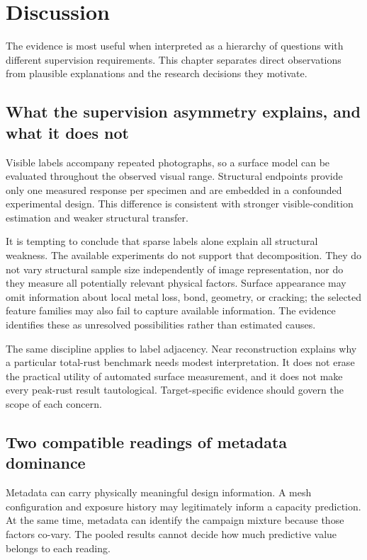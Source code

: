 \chapter{Discussion}\label{ch:discussion}
The evidence is most useful when interpreted as a hierarchy of questions with different supervision requirements. This chapter separates direct observations from plausible explanations and the research decisions they motivate.

\section{What the supervision asymmetry explains, and what it does not}
Visible labels accompany repeated photographs, so a surface model can be evaluated throughout the observed visual range. Structural endpoints provide only one measured response per specimen and are embedded in a confounded experimental design. This difference is consistent with stronger visible-condition estimation and weaker structural transfer.

It is tempting to conclude that sparse labels alone explain all structural weakness. The available experiments do not support that decomposition. They do not vary structural sample size independently of image representation, nor do they measure all potentially relevant physical factors. Surface appearance may omit information about local metal loss, bond, geometry, or cracking; the selected feature families may also fail to capture available information. The evidence identifies these as unresolved possibilities rather than estimated causes.

The same discipline applies to label adjacency. Near reconstruction explains why a particular total-rust benchmark needs modest interpretation. It does not erase the practical utility of automated surface measurement, and it does not make every peak-rust result tautological. Target-specific evidence should govern the scope of each concern.

\section{Two compatible readings of metadata dominance}
Metadata can carry physically meaningful design information. A mesh configuration and exposure history may legitimately inform a capacity prediction. At the same time, metadata can identify the campaign mixture because those factors co-vary. The pooled results cannot decide how much predictive value belongs to each reading.

